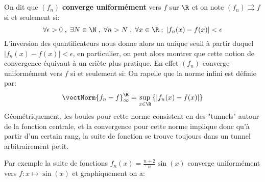 \subsection*{}
On dit que \((f_n)\) \textbf{converge uniformément} vers \(f\) sur \(\R\) et on note \((f_n) \rightrightarrows f\) si et seulement si:
\[
   \forall \epsilon > 0 \; , \; \exists N \in \N \; , \; \forall n > N \; , \; \forall x \in \R \; ; \; |f_n(x) - f(x)| < \epsilon
\]
L'inversion des quantificateurs nous donne alors un unique seuil à partir duquel \(|f_n(x) - f(x)| < \epsilon\), en particulier, on peut alors montrer que cette notion de convergence équivaut à un criète plus pratique. En effet \((f_n)\) converge uniformément vers \(f\) si et seulement si:
On rapelle que la norme infini est définie par:
\[
   \vectNorm{f_n - f}_\infty^\R = \underset{x \in \R}{\sup}\left\{\left|f_n(x) - f(x)\right|\right\}
\]
Géométriquement, les boules pour cette norme consistent en des "tunnels" autour de la fonction centrale, et la convergence pour cette norme implique donc qu'à partir d'un certain rang, la suite de fonction se trouve toujours dans un tunnel arbitrairement petit.
\pagebreak

Par exemple la suite de fonctions \(f_n(x) = \frac{n + 2}{n}\sin(x)\) converge uniformément vers \(f: x \mapsto \sin(x)\) et graphiquement on a:

\begin{center}
\end{center}
